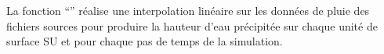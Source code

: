 La fonction ``\frenchname'' réalise une interpolation linéaire sur les données de pluie des fichiers sources pour produire la hauteur d'eau précipitée sur chaque unité de surface SU et pour chaque pas de temps de la simulation.